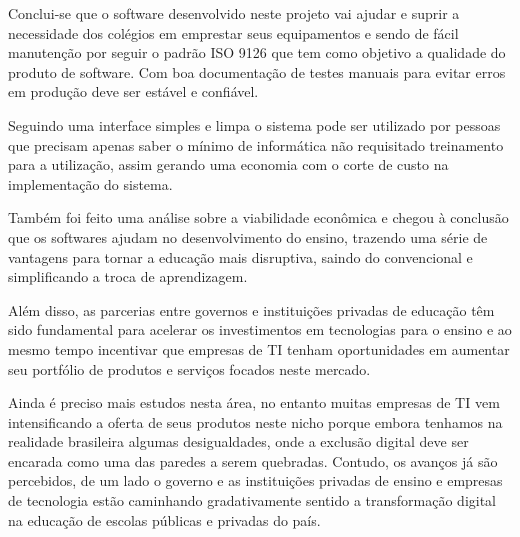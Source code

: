 \documentclass[
12pt,				%
oneside,			%
a4paper,			%
section=TITLE,
brazil,				%
]{abntex2}
\begin{document}
  Conclui-se que o software desenvolvido neste projeto vai ajudar e suprir a
  necessidade dos colégios em emprestar seus equipamentos e sendo de fácil
  manutenção por seguir o padrão ISO 9126 que tem como objetivo a qualidade do
  produto de software. Com boa documentação de testes manuais para evitar erros
  em produção deve ser estável e confiável.

  Seguindo uma interface simples e limpa o sistema pode ser utilizado por pessoas
  que precisam apenas saber o mínimo de informática não requisitado treinamento
  para a utilização, assim gerando uma economia com o corte de custo na
  implementação do sistema.

  Também foi feito uma análise sobre a viabilidade econômica e chegou à conclusão
  que os softwares ajudam no desenvolvimento do ensino, trazendo uma série de
  vantagens para tornar a educação mais disruptiva, saindo do convencional e
  simplificando a troca de aprendizagem.

  Além disso, as parcerias entre governos e instituições privadas de educação têm
  sido fundamental para acelerar os investimentos em tecnologias para o ensino e
  ao mesmo tempo incentivar que empresas de TI tenham oportunidades em aumentar
  seu portfólio de produtos e serviços focados neste mercado.

  Ainda é preciso mais estudos nesta área, no entanto muitas empresas de TI vem
  intensificando a oferta de seus produtos neste nicho porque embora tenhamos na
  realidade brasileira algumas desigualdades, onde a exclusão digital deve ser
  encarada como uma das paredes a serem quebradas.  Contudo, os avanços já são
  percebidos, de um lado o governo e as instituições privadas de ensino e
  empresas de tecnologia estão caminhando gradativamente sentido a transformação
  digital na educação de escolas públicas e privadas do país.
  \postextual

  









  \printindex


  
\end{document}
